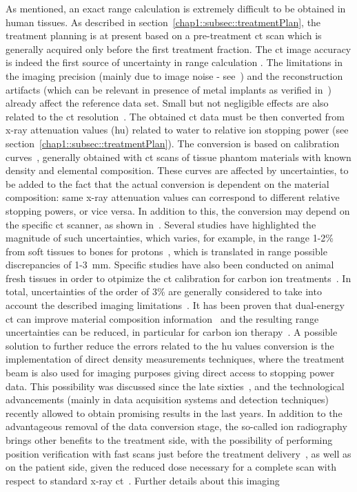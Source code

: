 As mentioned, an exact range calculation is extremely difficult to be obtained in human tissues. As described in section~\ref{chap1::subsec::treatmentPlan}, the treatment planning is at present based on a pre-treatment \gls{ct} scan which is generally acquired only before the first treatment fraction. The \gls{ct} image accuracy is indeed the first source of uncertainty in range calculation . The limitations in the imaging precision (mainly due to image noise - see~\cite{Chvetsov2010}) and the reconstruction artifacts (which can be relevant in presence of metal implants as verified in~\cite{Jakel2007, Newhauser2007}) already affect the reference data set. Small but not negligible effects are also related to the \gls{ct} resolution~\parencite{Espana2011}. The obtained \gls{ct} data must be then converted from x-ray attenuation values (\gls{hu}) related to water to relative ion stopping power (see section~\ref{chap1::subsec::treatmentPlan}). The conversion is based on calibration curves~\parencite{Schneider1996, Schneider2000}, generally obtained with \gls{ct} scans of tissue phantom materials with known density and elemental composition. These curves are affected by uncertainties, to be added to the fact that the actual conversion is dependent on the material composition: same x-ray attenuation values can correspond to different relative stopping powers, or vice versa. In addition to this, the conversion may depend on the specific \gls{ct} scanner, as shown in~\cite{Ainsley2014}. Several studies have highlighted the magnitude of such uncertainties, which varies, for example, in the range 1-2\% from soft tissues to bones for protons~\parencite{Schaffner1998b}, which is translated in range possible discrepancies of 1-3~mm. Specific studies have also been conducted on animal fresh tissues in order to otpimize the \gls{ct} calibration for carbon ion treatments~\parencite{Rietzel2007}. In total, uncertainties of the order of 3\% are generally considered to take into account the described imaging limitations~\parencite{Moyers2001}. It has been proven that dual-energy \gls{ct} can improve material composition information~\parencite{Bazalova2008, Yang2010, Hunemor2014, Wohlfahrt2018} and the resulting range uncertainties can be reduced, in particular for carbon ion therapy~\parencite{Hunemor2014}. A possible solution to further reduce the errors related to the \gls{hu} values conversion is the implementation of direct density measurements techniques, where the treatment beam is also used for imaging purposes giving direct access to stopping power data. This possibility was discussed since the late sixties~\parencite{Koehler1968}, and the technological advancements (mainly in data acquisition systems and detection techniques) recently allowed to obtain promising results in the last years. In addition to the advantageous removal of the data conversion stage, the so-called ion radiography brings other benefits to the treatment side, with the possibility of performing position verification with fast scans just before the treatment delivery~\parencite{Schneider1995}, as well as on the patient side, given the reduced dose necessary for a complete scan with respect to standard x-ray \gls{ct}~\parencite{Schneider1995}. Further details about this imaging 